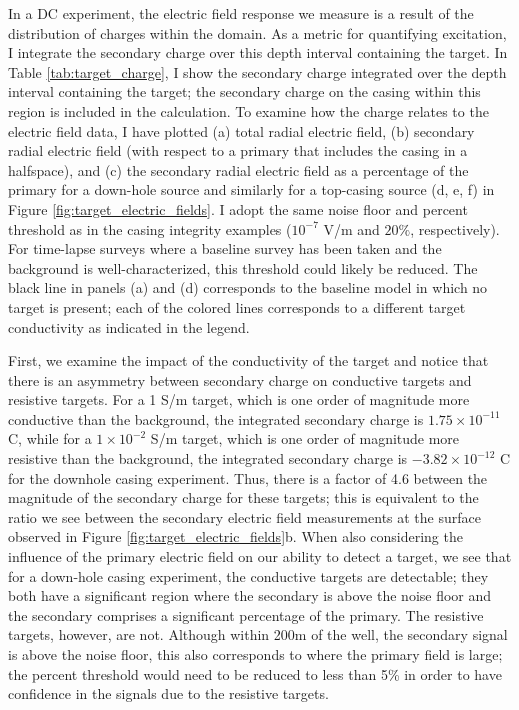




In a DC experiment, the electric field response we measure is a result of the distribution of charges within the domain. As a metric for quantifying excitation, I integrate the secondary charge over this depth interval containing the target. In Table \ref{tab:target_charge}, I show the secondary charge integrated over the depth interval containing the target; the secondary charge on the casing within this region is included in the calculation. To examine how the charge relates to the electric field data, I have plotted (a) total radial electric field, (b) secondary radial electric field (with respect to a primary that includes the casing in a halfspace), and (c) the secondary radial electric field as a percentage of the primary for a down-hole source and similarly for a top-casing source (d, e, f) in Figure \ref{fig:target_electric_fields}. I adopt the same noise floor and percent threshold as in the casing integrity examples ($10^{-7}$ V/m and $20\%$, respectively). For time-lapse surveys where a baseline survey has been taken and the background is well-characterized, this threshold could likely be reduced. The black line in panels (a) and (d) corresponds to the baseline model in which no target is present; each of the colored lines corresponds to a different target conductivity as indicated in the legend.









First, we examine the impact of the conductivity of the target and notice that there is an asymmetry between secondary charge on conductive targets and resistive targets. For a 1 S/m target, which is one order of magnitude more conductive than the background, the integrated secondary charge is $1.75 \times 10^{-11}$ C, while for a $1\times10^{-2}$ S/m target, which is one order of magnitude more resistive than the background, the integrated secondary charge is $-3.82 \times 10^{-12}$ C for the downhole casing experiment. Thus, there is a factor of 4.6 between the magnitude of the secondary charge for these targets; this is equivalent to the ratio we see between the secondary electric field measurements at the surface observed in Figure \ref{fig:target_electric_fields}b. When also considering the influence of the primary electric field on our ability to detect a target, we see that for a down-hole casing experiment, the conductive targets are detectable; they both have a significant region where the secondary is above the noise floor and the secondary comprises a significant percentage of the primary. The resistive targets, however, are not. Although within 200m of the well, the secondary signal is above the noise floor, this also corresponds to where the primary field is large; the percent threshold would need to be reduced to less than 5\% in order to have confidence in the signals due to the resistive targets.

